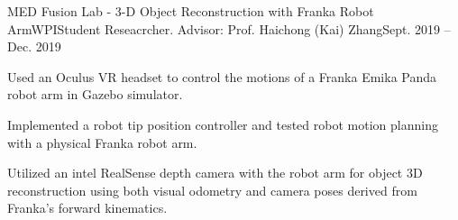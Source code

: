 \begin{rSubsection}{MED Fusion Lab - 3-D Object Reconstruction with Franka Robot Arm}{WPI}{Student Reseacrcher. Advisor: Prof. Haichong (Kai) Zhang}{Sept. 2019 -- Dec. 2019}
\item Used an Oculus VR headset to control the motions of a Franka Emika Panda robot arm in Gazebo simulator.
\item Implemented a robot tip position controller and tested robot motion planning with a physical Franka robot arm.
\item Utilized an intel RealSense depth camera with the robot arm for object 3D reconstruction using both visual odometry and camera poses derived from Franka's forward kinematics.
\end{rSubsection}